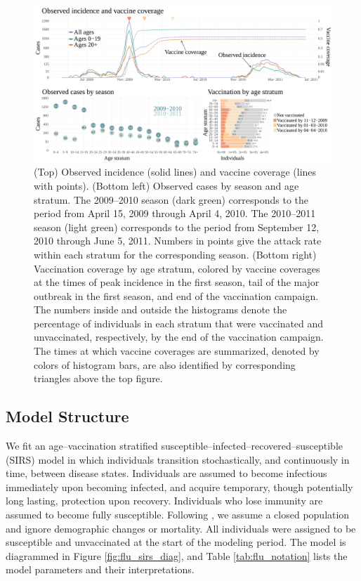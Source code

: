 \begin{figure}
	\centering
	\includegraphics[width=\linewidth]{figures/fludat_plots}
	\caption[A(H1N1)pdm09 incidence and vaccination data from Finland, April 15, 2009 --- June 5, 2011.]{(Top) Observed incidence (solid lines) and vaccine coverage (lines with points). (Bottom left) Observed cases by season and age stratum. The 2009--2010 season (dark green) corresponds to the period from April 15, 2009 through April 4, 2010. The 2010--2011 season (light green) corresponds to the period from September 12, 2010 through June 5, 2011. Numbers in points give the attack rate within each stratum for the corresponding season. (Bottom right) Vaccination coverage by age stratum, colored by vaccine coverages at the times of peak incidence in the first season, tail of the major outbreak in the first season, and end of the vaccination campaign. The numbers inside and outside the histograms denote the percentage of individuals in each stratum that were vaccinated and unvaccinated, respectively, by the end of the vaccination campaign. The times at which vaccine coverages are summarized, denoted by colors of histogram bars, are also identified by corresponding triangles above the top figure.}
	\label{fig:finland_fludat}
\end{figure}

\subsection{Model Structure}
\label{subsec:flu_modstructure}

We fit an age--vaccination stratified susceptible--infected--recovered--susceptible (SIRS) model in which individuals transition stochastically, and continuously in time, between disease states. Individuals are assumed to become infectious immediately upon becoming infected, and acquire temporary, though potentially long lasting, protection upon recovery. Individuals who lose immunity are assumed to become fully susceptible. Following \cite{shubin2016revealing}, we assume a closed population and ignore demographic changes or mortality. All individuals were assigned to be susceptible and unvaccinated at the start of the modeling period. The model is diagrammed in Figure \ref{fig:flu_sirs_diag}, and Table \ref{tab:flu_notation} lists the model parameters and their interpretations. 

